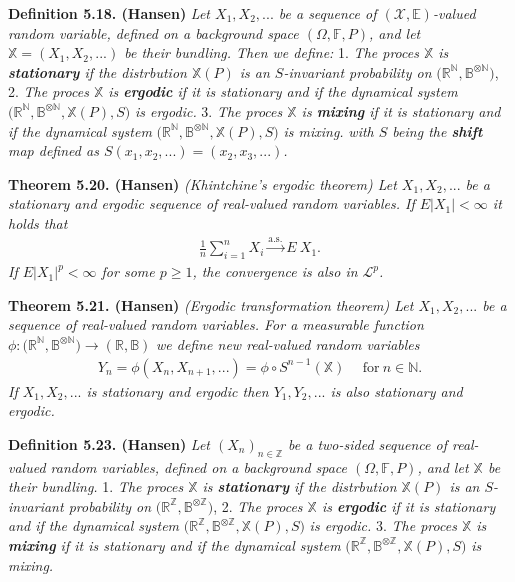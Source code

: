 \documentclass[a4paper,12pt,openany]{book}
\begin{document}
\textbf{Definition 5.18. (Hansen)} \emph{Let \(X_1,X_2,...\) be a sequence of \((\mathcal{X},\mathbb{E})\)-valued random variable, defined on a background space \((\Omega,\mathbb{F},P)\), and let \(\mathbb{X}=(X_1,X_2,...)\) be their bundling. Then we define:}
1. \emph{The proces \(\mathbb{X}\) is \textbf{stationary} if the distrbution \(\mathbb{X}(P)\) is an \(S\)-invariant probability on} \(\Big(\mathbb{R}^{\mathbb{N}},\mathbb{B}^{\otimes \mathbb{N}}\Big)\),
2. \emph{The proces \(\mathbb{X}\) is \textbf{ergodic} if it is stationary and if the dynamical system} \(\Big(\mathbb{R}^{\mathbb{N}},\mathbb{B}^{\otimes \mathbb{N}},\mathbb{X}(P),S\Big)\) \emph{is ergodic.}
3. \emph{The proces \(\mathbb{X}\) is \textbf{mixing} if it is stationary and if the dynamical system} \(\Big(\mathbb{R}^{\mathbb{N}},\mathbb{B}^{\otimes \mathbb{N}},\mathbb{X}(P),S\Big)\) \emph{is mixing.}
\emph{with \(S\) being the \textbf{shift} map defined as \(S(x_1,x_2,...)=(x_2,x_3,...)\).}

\textbf{Theorem 5.20. (Hansen)} \emph{(Khintchine's ergodic theorem) Let \(X_1,X_2,...\) be a stationary and ergodic sequence of real-valued random variables. If \(E\vert X_1\vert <\infty\) it holds that}
\begin{align*}
    \frac{1}{n}\sum_{i=1}^nX_i\stackrel{\text{a.s.}}{\to} E\ X_1.\tag{5.27}
\end{align*}
\emph{If \(E\vert X_1\vert ^p<\infty\) for some \(p\ge 1\), the convergence is also in \(\mathcal{L}^p\).}

\textbf{Theorem 5.21. (Hansen)} \emph{(Ergodic transformation theorem) Let \(X_1,X_2,...\) be a sequence of real-valued random variables. For a measurable function} \(\phi : \big(\mathbb{R}^{\mathbb{N}},\mathbb{B}^{\otimes\mathbb{N}}\big)\to (\mathbb{R},\mathbb{B})\) \emph{we define new real-valued random variables}
\begin{align*}
    Y_n=\phi(X_n,X_{n+1},...)=\phi\circ S^{n-1}(\mathbb{X})\hspace{15pt}\text{for}\ n\in\mathbb{N}.
\end{align*}
\emph{If \(X_1,X_2,...\) is stationary and ergodic then \(Y_1,Y_2,...\) is also stationary and ergodic.}

\textbf{Definition 5.23. (Hansen)} \emph{Let \((X_n)_{n\in\mathbb{Z}}\) be a two-sided sequence of real-valued random variables, defined on a background space \((\Omega,\mathbb{F},P)\), and let \(\mathbb{X}\) be their bundling.}
1. \emph{The proces \(\mathbb{X}\) is \textbf{stationary} if the distrbution \(\mathbb{X}(P)\) is an \(S\)-invariant probability on} \(\Big(\mathbb{R}^{\mathbb{Z}},\mathbb{B}^{\otimes \mathbb{Z}}\Big)\),
2. \emph{The proces \(\mathbb{X}\) is \textbf{ergodic} if it is stationary and if the dynamical system} \(\Big(\mathbb{R}^{\mathbb{Z}},\mathbb{B}^{\otimes \mathbb{Z}},\mathbb{X}(P),S\Big)\) \emph{is ergodic.}
3. \emph{The proces \(\mathbb{X}\) is \textbf{mixing} if it is stationary and if the dynamical system} \(\Big(\mathbb{R}^{\mathbb{Z}},\mathbb{B}^{\otimes \mathbb{Z}},\mathbb{X}(P),S\Big)\) \emph{is mixing.}
\end{document}
